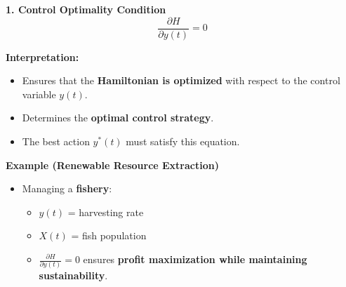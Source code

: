 \documentclass[
  ignorenonframetext,
]{beamer}
\providecommand{\tightlist}{%
  \setlength{\itemsep}{0pt}\setlength{\parskip}{0pt}}\usepackage{longtable,booktabs,array}
\begin{document}
\begin{frame}
\begin{block}{\textbf{1. Control Optimality Condition}}
\label{control-optimality-condition}
\[\frac{\partial H}{\partial y(t)}=0\]

\begin{block}{\textbf{Interpretation:}}
\label{interpretation}
\begin{itemize}
\tightlist
\item
  Ensures that the \textbf{Hamiltonian is optimized} with respect to the
  control variable \(y(t)\).\\
\item
  Determines the \textbf{optimal control strategy}.\\
\item
  The best action \(y^*(t)\) must satisfy this equation.
\end{itemize}
\end{block}

\begin{block}{\textbf{Example (Renewable Resource Extraction)}}
\label{example-renewable-resource-extraction}
\begin{itemize}
\tightlist
\item
  Managing a \textbf{fishery}:

  \begin{itemize}
  \tightlist
  \item
    \(y(t)\) = harvesting rate\\
  \item
    \(X(t)\) = fish population\\
  \item
    \(\frac{\partial H}{\partial y(t)}=0\) ensures \textbf{profit
    maximization while maintaining sustainability}.
  \end{itemize}
\end{itemize}
\end{block}
\end{block}
\end{frame}
\end{document}
